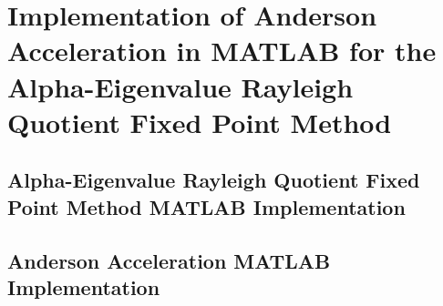 \chapter[Implementation of Anderson Acceleration in MATLAB for the Alpha-Eigenvalue Rayleigh Quotient Fixed Point Method][Anderson Acceleration MATLAB Implementation]{Implementation of Anderson Acceleration in MATLAB for the Alpha-Eigenvalue Rayleigh Quotient Fixed Point Method}

\label{AnderAccMATLAB}

\section{Alpha-Eigenvalue Rayleigh Quotient Fixed Point Method MATLAB Implementation}


\section{Anderson Acceleration MATLAB Implementation}
